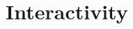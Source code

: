 \documentclass[xcolor=x11names,compress, aspectratio=169]{beamer}
\renewcommand{\(}{\begin{columns}}
\renewcommand{\)}{\end{columns}}
\newcommand{\<}[1]{\begin{column}{#1}}
\renewcommand{\>}{\end{column}}
\begin{document}
\begin{frame}
\begin{center}
\begin{enumerate}
\end{enumerate}
\end{center}
\end{frame}

\section{Interactivity}
\end{document}
